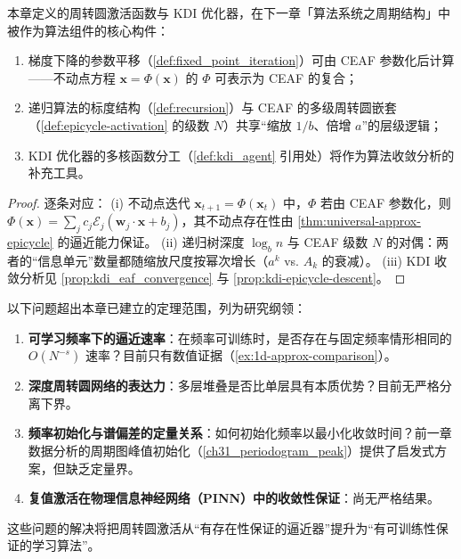 \begin{proposition}[激活函数向算法的传递]\label{prop:activation_to_algorithm_transfer}
本章定义的周转圆激活函数与 KDI 优化器，在下一章「算法系统之周期结构」中被作为算法组件的核心构件：
\begin{enumerate}[label=(\roman*)]
    \item 梯度下降的参数平移（\cref{def:fixed_point_iteration}）可由 CEAF 参数化后计算——不动点方程 $\mathbf{x} = \Phi(\mathbf{x})$ 的 $\Phi$ 可表示为 CEAF 的复合；
    \item 递归算法的标度结构（\cref{def:recursion}）与 CEAF 的多级周转圆嵌套（\cref{def:epicycle-activation} 的级数 $N$）共享“缩放 $1/b$、倍增 $a$”的层级逻辑；
    \item KDI 优化器的多核函数分工（\cref{def:kdi_agent} 引用处）将作为算法收敛分析的补充工具。
\end{enumerate}
\end{proposition}

\begin{proof}
逐条对应：
(i) 不动点迭代 $\mathbf{x}_{t+1}=\Phi(\mathbf{x}_t)$ 中，$\Phi$ 若由 CEAF 参数化，则 $\Phi(\mathbf{x}) = \sum_j c_j \mathcal E_j(\mathbf{w}_j \cdot \mathbf{x} + b_j)$，其不动点存在性由 \cref{thm:universal-approx-epicycle} 的逼近能力保证。
(ii) 递归树深度 $\log_b n$ 与 CEAF 级数 $N$ 的对偶：两者的“信息单元”数量都随缩放尺度按幂次增长（$a^k$ vs. $A_k$ 的衰减）。
(iii) KDI 收敛分析见 \cref{prop:kdi_eaf_convergence} 与 \cref{prop:kdi-epicycle-descent}。
\end{proof}

\begin{remark}[研究纲领]\label{rem:research-program}
以下问题超出本章已建立的定理范围，列为研究纲领：
\begin{enumerate}[label=(\roman*)]
    \item \textbf{可学习频率下的逼近速率}：在频率可训练时，是否存在与固定频率情形相同的 $O(N^{-s})$ 速率？目前只有数值证据（\cref{ex:1d-approx-comparison}）。
    \item \textbf{深度周转圆网络的表达力}：多层堆叠是否比单层具有本质优势？目前无严格分离下界。
    \item \textbf{频率初始化与谱偏差的定量关系}：如何初始化频率以最小化收敛时间？前一章数据分析的周期图峰值初始化（\cref{ch31_periodogram_peak}）提供了启发式方案，但缺乏定量界。
    \item \textbf{复值激活在物理信息神经网络（PINN）中的收敛性保证}：尚无严格结果。
\end{enumerate}
这些问题的解决将把周转圆激活从“有存在性保证的逼近器”提升为“有可训练性保证的学习算法”。
\end{remark}

